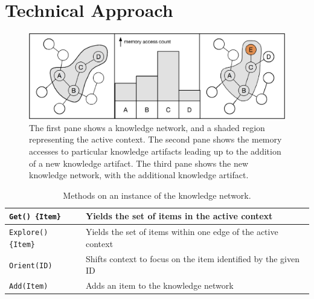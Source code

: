 \documentclass[11pt,letterpaper]{article}
\begin{document}
\section{Technical Approach}

\begin{figure}[h]
\centering
\includegraphics[scale=.5]{sf_add.eps}
\caption{The first pane shows a knowledge network, and a shaded region
  representing the active context. The second pane shows the memory accesses
  to particular knowledge artifacts leading up to the addition of a new
  knowledge artifact. The third pane shows the new knowledge network, with
  the additional knowledge artifact.}
\label{fig:sf_add}
\end{figure}

\begin{table}[h]
  \begin{center}
  \begin{tabular}{|l|p{4in}|}
    \hline
    {\tt Get() \{Item\}}     & Yields the set of items in the active context \\
                               \hline
    {\tt Explore() \{Item\}} & Yields the set of items within one edge of
                               the active context \\ \hline
    {\tt Orient(ID)}         & Shifts context to focus on the item identified
                               by the given ID \\ \hline
    {\tt Add(Item)}          & Adds an item to the knowledge network \\ \hline
  \end{tabular}
  \end{center}
\caption{Methods on an instance of the knowledge network.}
\label{tab:sf_get}
\end{table}
\end{document}
